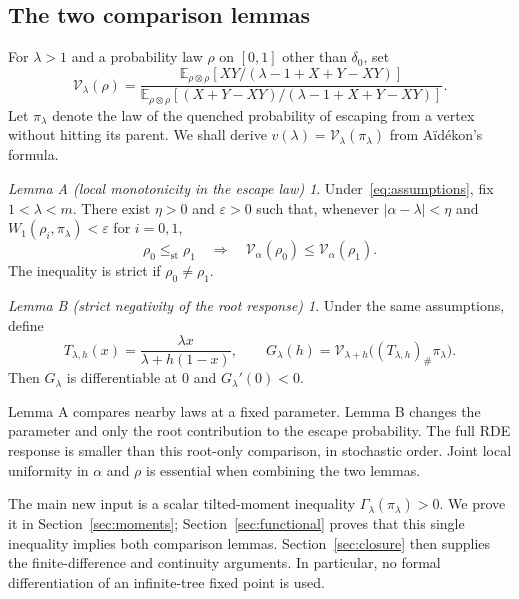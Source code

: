 \documentclass[11pt,a4paper]{article}
\numberwithin{equation}{section}
\theoremstyle{plain}
\theoremstyle{definition}
\theoremstyle{remark}
\newtheorem*{lemmaA}{Lemma A (local monotonicity in the escape law)}
\newtheorem*{lemmaB}{Lemma B (strict negativity of the root response)}
\newcommand{\E}{\mathbb E}
\newcommand{\st}{\mathrm{st}}
\newcommand{\V}{\mathcal V}
\begin{document}
\subsection{The two comparison lemmas}

For $\lambda>1$ and a probability law $\rho$ on $[0,1]$ other than
$\delta_0$, set
\begin{equation}\label{eq:V-intro}
 \V_\lambda(\rho)
 =\frac{\E_{\rho\otimes\rho}
     [XY/(\lambda-1+X+Y-XY)]}
 {\E_{\rho\otimes\rho}
     [(X+Y-XY)/(\lambda-1+X+Y-XY)]}.
\end{equation}
Let $\pi_\lambda$ denote the law of the quenched probability of escaping
from a vertex without hitting its parent.  We shall derive
$v(\lambda)=\V_\lambda(\pi_\lambda)$ from A\"id\'ekon's formula.

\begin{lemmaA}
Under~\eqref{eq:assumptions}, fix $1<\lambda<m$.  There exist $\eta>0$ and
$\varepsilon>0$ such that, whenever
$|\alpha-\lambda|<\eta$ and $W_1(\rho_i,\pi_\lambda)<\varepsilon$ for
$i=0,1$,
\begin{equation}\label{eq:A-intro}
 \rho_0\le_{\st}\rho_1
 \quad\Longrightarrow\quad
 \V_\alpha(\rho_0)\le\V_\alpha(\rho_1).
\end{equation}
The inequality is strict if $\rho_0\ne\rho_1$.
\end{lemmaA}

\begin{lemmaB}
Under the same assumptions, define
\begin{equation}\label{eq:root-map-intro}
 T_{\lambda,h}(x)
 =\frac{\lambda x}{\lambda+h(1-x)},\qquad
 G_\lambda(h)=\V_{\lambda+h}
       \bigl((T_{\lambda,h})_\#\pi_\lambda\bigr).
\end{equation}
Then $G_\lambda$ is differentiable at $0$ and $G_\lambda'(0)<0$.
\end{lemmaB}

Lemma A compares nearby laws at a fixed parameter.  Lemma B changes the
parameter and only the root contribution to the escape probability.  The
full RDE response is smaller than this root-only comparison, in stochastic
order.  Joint local uniformity in $\alpha$ and $\rho$ is essential when
combining the two lemmas.

The main new input is a scalar tilted-moment inequality
$\Gamma_\lambda(\pi_\lambda)>0$.  We prove it in
Section~\ref{sec:moments}; Section~\ref{sec:functional} proves that this
single inequality implies both comparison lemmas.  Section~\ref{sec:closure}
then supplies the finite-difference and continuity arguments.  In
particular, no formal differentiation of an infinite-tree fixed point is
used.
\end{document}

